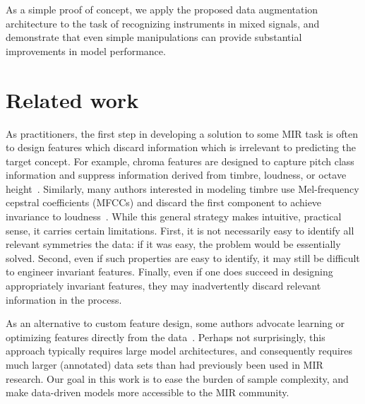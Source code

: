 \documentclass{article}
\begin{document}
As a simple proof of concept, we apply the proposed data augmentation architecture to the
task of recognizing instruments in mixed signals, and demonstrate that even simple
manipulations can provide substantial improvements in model performance.

\section{Related work}

As practitioners, the first step in developing a solution to some MIR task is often to 
design features which discard information which is irrelevant to predicting the target
concept.  For example, chroma features are designed to capture pitch class information
and suppress information derived from timbre, loudness, or octave 
height~\cite{muller2011chroma}.  Similarly, many authors interested in modeling timbre
use Mel-frequency cepstral coefficients (MFCCs) and discard the first component to
achieve invariance to loudness~\cite{pampalk2004matlab}.
While this general strategy makes intuitive, practical sense, it carries certain
limitations.  First, it is not necessarily easy to identify all relevant symmetries the
data: if it was easy, the problem would be essentially solved.  Second, even if such
properties are easy to identify, it may still be difficult to engineer invariant
features.  Finally, even if one does succeed in designing appropriately invariant
features, they may inadvertently discard relevant information in the process.

%
%   
%
As an alternative to custom feature design, some authors advocate learning or optimizing
features directly from the data~\cite{humphrey2012moving}.  
Perhaps not surprisingly, this approach typically requires large model architectures, and 
consequently requires much larger (annotated) data sets than had previously been 
used in MIR research.  
Our goal in this work is to ease the burden of sample complexity, and make 
data-driven models more accessible to the MIR community.
\end{document}
